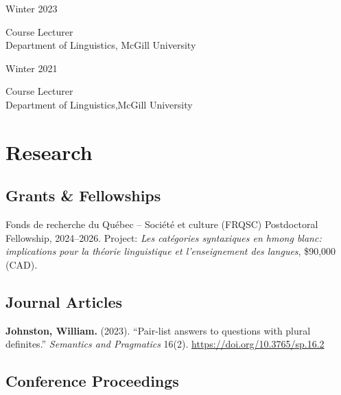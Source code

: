 \documentclass[11pt,oneside,DIV=calc,parskip=off]{scrarticle} %
\newlength{\leftcolwidth}
\newlength{\rightcolwidth}
\newlength{\spacingbefore}
\newlength{\spacingafter}
\newcommand{\myonecol}[1]{%
	\vspace{\spacingbefore}%
	\begin{minipage}[t]{\linewidth}%
		\strut#1%
	\end{minipage}%
	\vspace{\spacingafter}\par%
	}
\newcommand{\mytwocol}[2]{%
	\vspace{\spacingbefore}%
	\begin{minipage}[t]{\leftcolwidth}%
		\strut#1%
	\end{minipage}%
	\begin{minipage}[t]{\rightcolwidth}%
		\strut#2%
	\end{minipage}%
	\vspace{\spacingafter}\par%
	}
\newcommand{\pub}[1]{%
	\myonecol{#1}%
	}
\newcommand{\cvline}[2]{%
	\mytwocol{#1}{#2}%
	}
\begin{document}

\cvline{Winter 2023}{Course Lecturer\\Department of Linguistics, McGill University}

\cvline{Winter 2021}{Course Lecturer\\Department of Linguistics,McGill University}


\section{Research}

\subsection{Grants \& Fellowships}

\pub{Fonds de recherche du Québec -- Société et culture (FRQSC) Postdoctoral Fellowship, 2024--2026. Project: \textit{Les catégories syntaxiques en hmong blanc: implications pour la théorie linguistique et l'enseignement des langues}, %
\$90,000 (CAD).}

\subsection{Journal Articles}

\pub{\textbf{Johnston, William.} (2023). ``Pair-list answers to questions with plural definites.'' \textit{Semantics and Pragmatics} 16(2). \href{https://doi.org/10.3765/sp.16.2}{https://doi.org/10.3765/sp.16.2}}


\subsection{Conference Proceedings}
\end{document}
